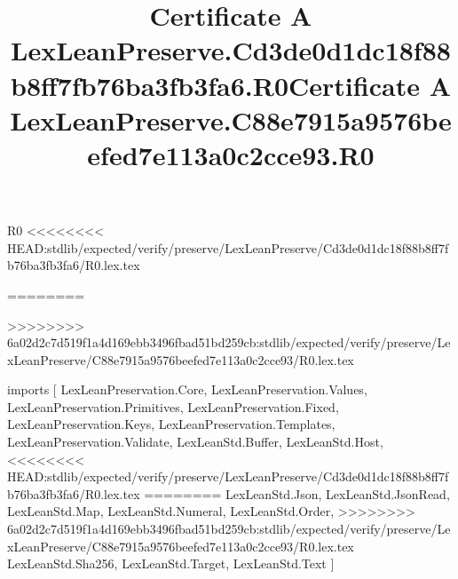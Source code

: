 \begin{lexlean}{R0}
<<<<<<<< HEAD:stdlib/expected/verify/preserve/LexLeanPreserve/Cd3de0d1dc18f88b8ff7fb76ba3fb3fa6/R0.lex.tex
\title{Certificate A LexLeanPreserve.Cd3de0d1dc18f88b8ff7fb76ba3fb3fa6.R0}
========
\title{Certificate A LexLeanPreserve.C88e7915a9576beefed7e113a0c2cce93.R0}
>>>>>>>> 6a02d2c7d519f1a4d169ebb3496fbad51bd259cb:stdlib/expected/verify/preserve/LexLeanPreserve/C88e7915a9576beefed7e113a0c2cce93/R0.lex.tex
\begin{coremodule}
imports [
  LexLeanPreservation.Core,
  LexLeanPreservation.Values,
  LexLeanPreservation.Primitives,
  LexLeanPreservation.Fixed,
  LexLeanPreservation.Keys,
  LexLeanPreservation.Templates,
  LexLeanPreservation.Validate,
  LexLeanStd.Buffer,
  LexLeanStd.Host,
<<<<<<<< HEAD:stdlib/expected/verify/preserve/LexLeanPreserve/Cd3de0d1dc18f88b8ff7fb76ba3fb3fa6/R0.lex.tex
========
  LexLeanStd.Json,
  LexLeanStd.JsonRead,
  LexLeanStd.Map,
  LexLeanStd.Numeral,
  LexLeanStd.Order,
>>>>>>>> 6a02d2c7d519f1a4d169ebb3496fbad51bd259cb:stdlib/expected/verify/preserve/LexLeanPreserve/C88e7915a9576beefed7e113a0c2cce93/R0.lex.tex
  LexLeanStd.Sha256,
  LexLeanStd.Target,
  LexLeanStd.Text
]


\end{coremodule}
\end{lexlean}
